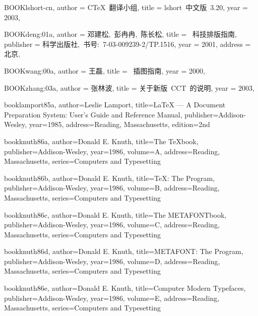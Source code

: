 BOOK{lshort-cn,
        author =       {C\TeX{}~翻译小组},
        title =        {lshort~中文版~3.20},
        year =         {2003},
}

BOOK{deng:01a,
        author =       {{邓建松,~彭冉冉,~陈长松}},
        title =        {\LaTeXe{}~科技排版指南},
        publisher =    {科学出版社,~书号:~7-03-009239-2/TP.1516},
        year =         {2001},
        address =      {北京},
}

BOOK{wang:00a,
        author =       {王磊},
        title =        {\LaTeXe{}~插图指南},
        year =         {2000},
}

BOOK{zhang:03a,
        author =       {张林波},
        title =        {关于新版~CCT~的说明},
        year =         {2003},
}

book{lamport85a,
        author={Leslie Lamport},
        title={{LaTeX} --- A Document Preparation System: User's Guide and Reference Manual},
        publisher={Addison-Wesley},
        year={1985},
        address={Reading, Massachusetts},
        edition={2nd}
}

book{knuth86a,
        author={Donald E. Knuth},
        title={The {TeX}book},
        publisher={Addison-Wesley},
        year={1986},
        volume={A},
        address={Reading, Massachusetts},
        series={Computers and Typesetting}
}

book{knuth86b,
        author={Donald E. Knuth},
        title={{TeX}: The Program},
        publisher={Addison-Wesley},
        year={1986},
        volume={B},
        address={Reading, Massachusetts},
        series={Computers and Typesetting}
}

book{knuth86c,
        author={Donald E. Knuth},
        title={The {METAFONT}book},
        publisher={Addison-Wesley},
        year={1986},
        volume={C},
        address={Reading, Massachusetts},
        series={Computers and Typesetting}
}

book{knuth86d,
        author={Donald E. Knuth},
        title={{METAFONT}: The Program},
        publisher={Addison-Wesley},
        year={1986},
        volume={D},
        address={Reading, Massachusetts},
        series={Computers and Typesetting}
}

book{knuth86e,
        author={Donald E. Knuth},
        title={Computer Modern Typefaces},
        publisher={Addison-Wesley},
        year={1986},
        volume={E},
        address={Reading, Massachusetts},
        series={Computers and Typesetting}
}


